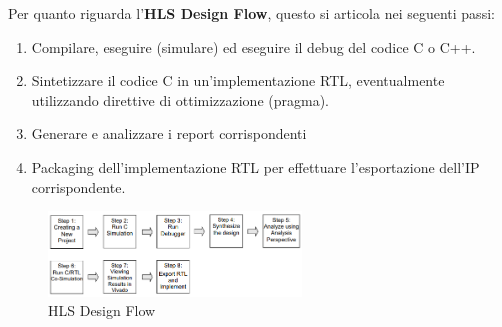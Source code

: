 Per quanto riguarda l'\textbf{HLS Design Flow}, questo si articola nei seguenti passi:
\begin{enumerate}
    \item Compilare, eseguire (simulare) ed eseguire il debug del codice C o C++.
    \item Sintetizzare il codice C in un'implementazione RTL, eventualmente utilizzando direttive di ottimizzazione (pragma).
    \item  Generare e analizzare i report corrispondenti
    \item Packaging dell'implementazione RTL per effettuare l'esportazione dell'IP corrispondente.
\end{enumerate}

\begin{figure}[H]
    \centering
    \includegraphics[width=0.6\textwidth]{introduction/designflow.png}
    \caption{HLS Design Flow}
\end{figure}